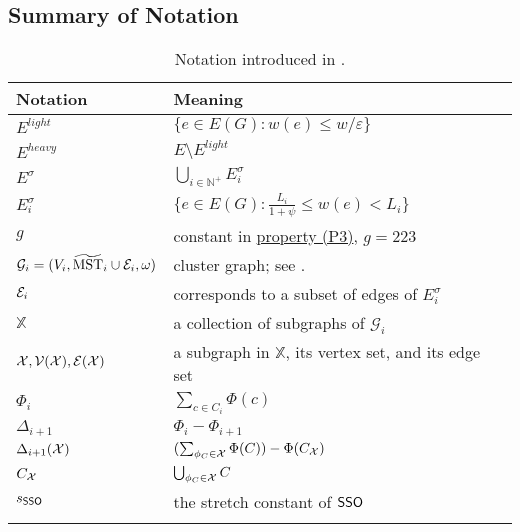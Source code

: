 \subsection{Summary of Notation}
\renewcommand{\arraystretch}{1.3}
\begin{longtable}{| l | l|} 
	\hline
	\textbf{Notation} & \textbf{Meaning} \\ \hline
	$E^{light}$ &$ \{e \in E(G) : w(e)\le w/\varepsilon\}$\\ \hline 
	$E^{heavy}$ & $E \setminus E^{light}$ \\\hline
	$E^{\sigma} $ & $\bigcup_{i \in \mathbb{N}^{+}}E_{i}^{\sigma}$\\\hline
	$E_{i}^{\sigma} $ & $\{e \in E(G) : \frac{L_i}{1+\psi} \leq w(e) < L_i\}$\\\hline
	$g$ & constant in \hyperlink{P3}{property (P3)}, $g = 223$ \\\hline
	$\mathcal{G}_i = (V_i, \widetilde{\mathrm{MST}}_{i} \cup \mathcal{E}_i, \omega)$ & cluster graph; see \Cref{def:ClusterGraphNew}. \\\hline
	$\mathcal{E}_i$ & corresponds to a subset of edges of $E^{\sigma}_i$\\\hline
	$\mathbb{X}$ & a collection of subgraphs of $\mathcal{G}_i$\\\hline
	$\mathcal{X}, \mathcal{V}(\mathcal{X}), \mathcal{E}(\mathcal{X})$ & a subgraph in $\mathbb{X}$, its vertex set, and its edge set\\\hline
	$\Phi_i$ & $\sum_{c \in C_i}\Phi(c)$ \\\hline
	$\Delta_{i+1} $&$ \Phi_i - \Phi_{i+1}$\\\hline
	$\Delta_{i+1}(\mathcal{X})$ & $(\sum_{\phi_C\in \mathcal{X} }\Phi(C) ) - \Phi(C_{\mathcal{X}})$\\\hline
	$C_{\mathcal{X}}$ & $\bigcup_{\phi_C \in \mathcal{X}}C$ \\\hline
	$s_{\mathsf{SSO}}$ & the stretch constant of \hyperlink{SPHigh}{$\mathsf{SSO}$}\\\hline
	\caption{Notation introduced in \Cref{sec:framework}.}
	\label{table:notation}
\end{longtable}
\renewcommand{\arraystretch}{1}